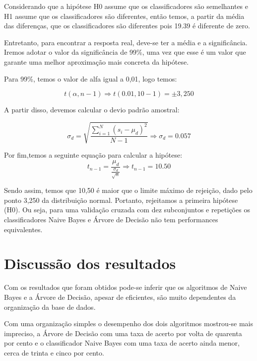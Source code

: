 \documentclass[preprint,12pt,times]{elsarticle}
\begin{document}
	Considerando que a hipótese H0 assume que os classificadores são semelhantes e H1 assume que os classificadores são diferentes, então temos, a partir da média das diferenças, que os classificadores são diferentes pois 19.39 é diferente de zero.
	
	Entretanto, para encontrar a resposta real, deve-se ter a média e a significância. Iremos adotar o valor da significância de 99\%, uma vez que esse é um valor que garante uma melhor aproximação mais concreta da hipótese.  
	
	Para 99\%, temos o valor de alfa igual a 0,01, logo temos:
	
	\begin{equation} 
	t (\alpha, n- 1) \Rightarrow t (0.01 , 10-1) =  \pm 3,250
	\end{equation}
	
	A partir disso, devemos calcular o devio padrão amostral:
	
	\begin{equation} 
	\sigma _{d} = \sqrt{\frac{\sum_{i=1}^{N}(s_{i} - \mu_{d})^{2}}{N - 1}} \Rightarrow \sigma _{d} = 0.057
	\end{equation}
	
	Por fim,temos a seguinte equação para calcular a hipótese:
	\begin{equation}
	t_{n-1} = \frac{\mu _{d}}{\frac{\sigma _{d}}{\sqrt{n}}} \Rightarrow t_{n-1} =   10.50
	\end{equation}
	
	Sendo assim, temos que 10,50 é maior que o limite máximo de rejeição, dado pelo ponto 3,250 da distribuição normal. Portanto, rejeitamos a primeira hipótese (H0). Ou seja, para uma validação cruzada com dez subconjuntos e repetições os classificadores Naive Bayes e Árvore de Decisão não tem performances equivalentes.
	
	\section{Discussão dos resultados}
	\label{Discussão dos resultados}
	
	Com os resultados que foram obtidos pode-se inferir que os algoritmos de Naive Bayes e a Árvore de Decisão, apesar de eficientes, são muito dependentes da organização da base de dados.
	
	Com uma organização simples o desempenho dos dois algoritmos mostrou-se mais impreciso, a Árvore de Decisão com uma taxa de acerto por volta de quarenta por cento e o classificador Naive Bayes com uma taxa de acerto ainda menor, cerca de trinta e cinco por cento.
	
\end{document}
